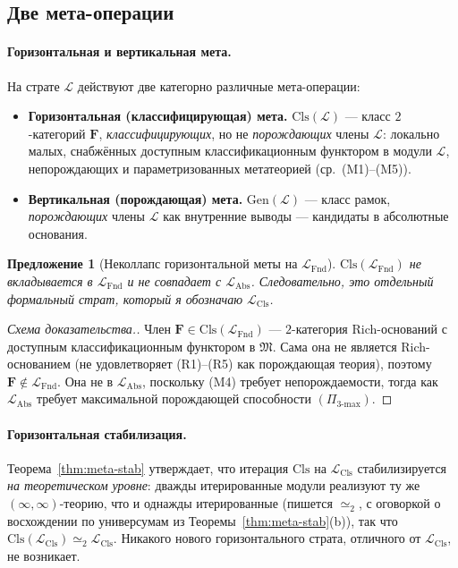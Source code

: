 \documentclass[11pt]{article}
\theoremstyle{plain}
\newtheorem{proposition}[theorem]{Предложение}
\theoremstyle{definition}
\newcommand{\fM}{\mathfrak{M}}
\newcommand{\LFnd}{\mathcal{L}_{\mathrm{Fnd}}}
\newcommand{\LCls}{\mathcal{L}_{\mathrm{Cls}}}
\newcommand{\LAbs}{\mathcal{L}_{\mathrm{Abs}}}
\begin{document}
\subsection{Две мета-операции}\label{sec:indexing-scheme}

\paragraph{Горизонтальная и вертикальная мета.} На страте $\mathcal{L}$ действуют две категорно различные мета-операции:
\begin{itemize}
\item \textbf{Горизонтальная (классифицирующая) мета.} $\mathrm{Cls}(\mathcal{L})$ — класс $2$-категорий $\mathbf{F}$, \emph{классифицирующих}, но не \emph{порождающих} члены $\mathcal{L}$: локально малых, снабжённых доступным классификационным функтором в модули $\mathcal{L}$, непорождающих и параметризованных метатеорией (ср.\ (M1)--(M5)).
\item \textbf{Вертикальная (порождающая) мета.} $\mathrm{Gen}(\mathcal{L})$ — класс рамок, \emph{порождающих} члены $\mathcal{L}$ как внутренние выводы --- кандидаты в абсолютные основания.
\end{itemize}

\begin{proposition}[Неколлапс горизонтальной меты на $\LFnd$]\label{prop:no-collapse}
$\mathrm{Cls}(\LFnd)$ \emph{не} вкладывается в $\LFnd$ и не совпадает с $\LAbs$. Следовательно, это отдельный формальный страт, который я обозначаю $\LCls$.
\end{proposition}

\begin{proof}[Схема доказательства.]
Член $\mathbf{F} \in \mathrm{Cls}(\LFnd)$ — $2$-категория Rich-оснований с доступным классификационным функтором в $\fM$. Сама она не является Rich-основанием (не удовлетворяет (R1)--(R5) как порождающая теория), поэтому $\mathbf{F} \notin \LFnd$. Она не в $\LAbs$, поскольку (M4) требует непорождаемости, тогда как $\LAbs$ требует максимальной порождающей способности $(\Pi_{3\text{-max}})$.
\end{proof}

\paragraph{Горизонтальная стабилизация.} Теорема~\ref{thm:meta-stab} утверждает, что итерация $\mathrm{Cls}$ на $\LCls$ стабилизируется \emph{на теоретическом уровне}: дважды итерированные модули реализуют ту же $(\infty, \infty)$-теорию, что и однажды итерированные (пишется $\simeq_2$, с оговоркой о восхождении по универсумам из Теоремы~\ref{thm:meta-stab}(b)), так что $\mathrm{Cls}(\LCls) \simeq_2 \LCls$. Никакого нового горизонтального страта, отличного от $\LCls$, не возникает.
\end{document}
